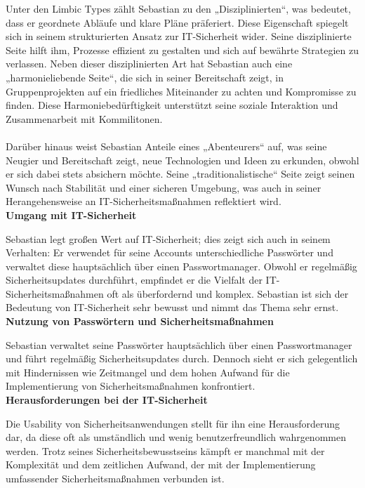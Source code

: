\documentclass[german,report]{i1thesis}
\begin{document}
Unter den Limbic Types zählt Sebastian zu den „Disziplinierten“, was bedeutet, dass er geordnete Abläufe und klare Pläne präferiert. Diese Eigenschaft spiegelt sich in seinem strukturierten Ansatz zur IT-Sicherheit wider. Seine disziplinierte Seite hilft ihm, Prozesse effizient zu gestalten und sich auf bewährte Strategien zu verlassen. Neben dieser disziplinierten Art hat Sebastian auch eine „harmonieliebende Seite“, die sich in seiner Bereitschaft zeigt, in Gruppenprojekten auf ein friedliches Miteinander zu achten und Kompromisse zu finden. Diese Harmoniebedürftigkeit unterstützt seine soziale Interaktion und Zusammenarbeit mit Kommilitonen.\\
\\
Darüber hinaus weist Sebastian Anteile eines „Abenteurers“ auf, was seine Neugier und Bereitschaft zeigt, neue Technologien und Ideen zu erkunden, obwohl er sich dabei stets absichern möchte. Seine „traditionalistische“ Seite zeigt seinen Wunsch nach Stabilität und einer sicheren Umgebung, was auch in seiner Herangehensweise an IT-Sicherheitsmaßnahmen reflektiert wird.\\

\textbf{Umgang mit IT-Sicherheit}

Sebastian legt großen Wert auf IT-Sicherheit; dies zeigt sich auch in seinem Verhalten: Er verwendet für seine Accounts unterschiedliche Passwörter und verwaltet diese hauptsächlich über einen Passwortmanager. Obwohl er regelmäßig Sicherheitsupdates durchführt, empfindet er die Vielfalt der IT-Sicherheitsmaßnahmen oft als überfordernd und komplex. Sebastian ist sich der Bedeutung von IT-Sicherheit sehr bewusst und nimmt das Thema sehr ernst.\\

\textbf{Nutzung von Passwörtern und Sicherheitsmaßnahmen}

Sebastian verwaltet seine Passwörter hauptsächlich über einen Passwortmanager und führt regelmäßig Sicherheitsupdates durch. Dennoch sieht er sich gelegentlich mit Hindernissen wie Zeitmangel und dem hohen Aufwand für die Implementierung von Sicherheitsmaßnahmen konfrontiert.\\

\textbf{Herausforderungen bei der IT-Sicherheit}

Die Usability von Sicherheitsanwendungen stellt für ihn eine Herausforderung dar, da diese oft als umständlich und wenig benutzerfreundlich wahrgenommen werden. Trotz seines Sicherheitsbewusstseins kämpft er manchmal mit der Komplexität und dem zeitlichen Aufwand, der mit der Implementierung umfassender Sicherheitsmaßnahmen verbunden ist.\\
\end{document}
